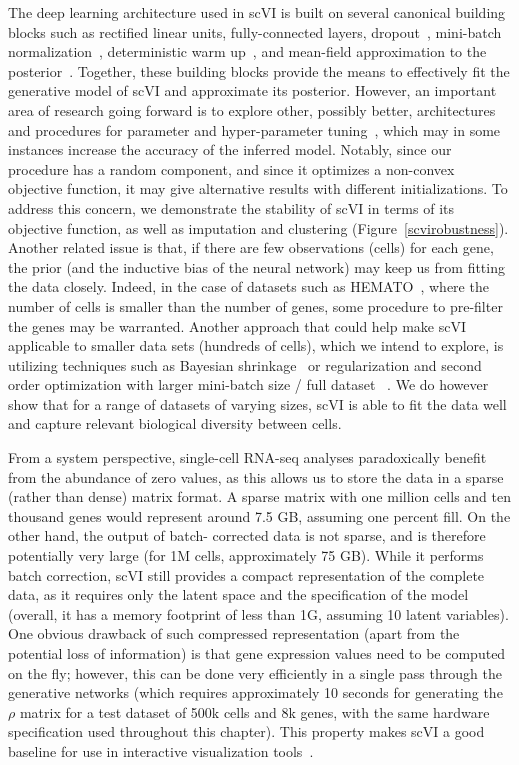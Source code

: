 The deep learning architecture used in scVI is built on several canonical building blocks such as rectified linear units, fully-connected layers, dropout~\cite{Srivastava2014}, mini-batch normalization~\cite{Ioffe2015}, deterministic warm up~\cite{Sønderby2016}, and mean-field approximation to the posterior~\cite{kingma2013}. Together, these building blocks provide the means to effectively fit the generative model of scVI and approximate its posterior. However, an important area of research going forward is to explore other, possibly better, architectures~\cite{Zoph} and procedures for parameter and hyper-parameter tuning~\cite{Bergstra2011}, which may in some instances increase the accuracy of the inferred model. Notably, since our procedure has a random component, and since it optimizes a non-convex objective function, it may give alternative results with different initializations. To address this concern, we demonstrate the stability of scVI in terms of its objective function, as well as imputation and clustering (Figure~\ref{scvirobustness}). Another related issue is that, if there are few observations (cells) for each gene, the prior (and the inductive bias of the neural network) may keep us from fitting the data closely. Indeed, in the case of datasets such as HEMATO~\cite{Tusi2018}, where the number of cells is smaller than the number of genes, some procedure to pre-filter the genes may be warranted. Another approach that could help make scVI applicable to smaller data sets (hundreds of cells), which we intend to explore, is utilizing techniques such as Bayesian shrinkage~\cite{deseq2} or regularization and second order optimization with larger mini-batch size / full dataset ~\cite{zinbwave}. We do however show that for a range of datasets of varying sizes, scVI is able to fit the data well  and capture relevant biological diversity between cells.

From a system perspective, single-cell RNA-seq analyses paradoxically benefit from the abundance of zero values, as this allows us to store the data in a sparse (rather than dense) matrix format. A sparse matrix with one million cells and ten thousand genes would represent around 7.5 GB, assuming one percent fill. On the other hand, the output of batch- corrected data is not sparse, and is therefore potentially very large (for 1M cells, approximately 75 GB). While it performs batch correction, scVI still provides a compact representation of the complete data, as it requires only the latent space and the specification of the model (overall, it has a memory footprint of less than 1G, assuming 10 latent variables). One obvious drawback of such compressed representation (apart from the potential loss of information) is that gene expression values need to be computed on the fly; however, this can be done very efficiently in a single pass through the generative networks (which requires approximately 10 seconds for generating the $\rho$ matrix for a test dataset of 500k cells and 8k genes, with the same hardware specification used throughout this chapter). This property makes scVI a good baseline for use in interactive visualization tools~\cite{DeTomaso2016, Fan2016, Wolf2018}.

